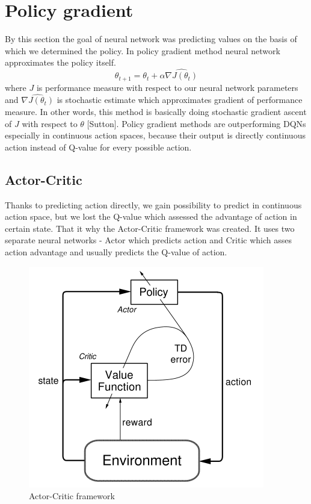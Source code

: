 \section{Policy gradient}
By this section the goal of neural network was predicting values on the basis of which we determined the policy. In policy gradient method neural network approximates the policy itself. 
\begin{equation}
\theta_{t+1} = \theta_t + \alpha \widehat{\nabla J(\theta_t)}
\end{equation}
where $J$ is performance measure with respect to our neural network parameters and $\widehat{\nabla J(\theta_t)}$ is stochastic estimate which approximates gradient of performance measure. In other words, this method is basically doing stochastic gradient ascent of $J$ with respect to $\theta$ [Sutton]. Policy gradient methods are outperforming DQNs especially in continuous action spaces, because their output is directly continuous action instead of Q-value for every possible action.

\subsection{Actor-Critic}
Thanks to predicting action directly, we gain possibility to predict in continuous action space, but we lost the Q-value which assessed the advantage of action in certain state. That it why the Actor-Critic framework was created. It uses two separate neural networks - Actor which predicts action and Critic which asses action advantage and usually predicts the Q-value of action.
\begin{figure}[!h]
\centering
\includegraphics[scale=0.55]{fig/actor-critic.png}
\caption{Actor-Critic framework}
\end{figure}
\clearpage

